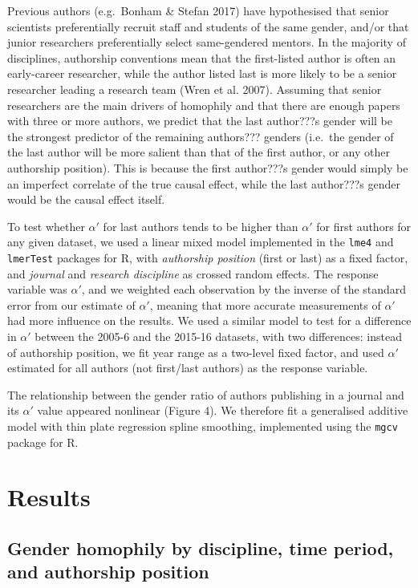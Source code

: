 \documentclass[12pt,]{article}
\begin{document}
Previous authors (e.g.~Bonham \& Stefan 2017) have hypothesised that
senior scientists preferentially recruit staff and students of the same
gender, and/or that junior researchers preferentially select
same-gendered mentors. In the majority of disciplines, authorship
conventions mean that the first-listed author is often an early-career
researcher, while the author listed last is more likely to be a senior
researcher leading a research team (Wren et al. 2007). Assuming that
senior researchers are the main drivers of homophily and that there are
enough papers with three or more authors, we predict that the last
author???s gender will be the strongest predictor of the remaining
authors??? genders (i.e.~the gender of the last author will be more
salient than that of the first author, or any other authorship
position). This is because the first author???s gender would simply be
an imperfect correlate of the true causal effect, while the last
author???s gender would be the causal effect itself.

To test whether \(\alpha'\) for last authors tends to be higher than
\(\alpha'\) for first authors for any given dataset, we used a linear
mixed model implemented in the \texttt{lme4} and \texttt{lmerTest}
packages for R, with \emph{authorship position} (first or last) as a
fixed factor, and \emph{journal} and \emph{research discipline} as
crossed random effects. The response variable was \(\alpha'\), and we
weighted each observation by the inverse of the standard error from our
estimate of \(\alpha'\), meaning that more accurate measurements of
\(\alpha'\) had more influence on the results. We used a similar model
to test for a difference in \(\alpha'\) between the 2005-6 and the
2015-16 datasets, with two differences: instead of authorship position,
we fit year range as a two-level fixed factor, and used \(\alpha'\)
estimated for all authors (not first/last authors) as the response
variable.

The relationship between the gender ratio of authors publishing in a
journal and its \(\alpha'\) value appeared nonlinear (Figure 4). We
therefore fit a generalised additive model with thin plate regression
spline smoothing, implemented using the \texttt{mgcv} package for R.

\section{Results}\label{results}

\subsection{Gender homophily by discipline, time period, and authorship
position}\label{gender-homophily-by-discipline-time-period-and-authorship-position}
\end{document}
